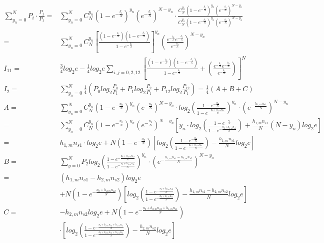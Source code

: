 \documentclass[12pt]{article}
\begin{document}
\begin{equation*}
    \begin{aligned}
       \sum_{y_n=0}^NP_i·\frac{P_j}{P_1}=&\sum_{y_n=0}^NC_N^{y_n}\left(1-e^{-\frac{k_i}{N}}\right)^{y_n}\left(e^{-\frac{k_i}{N}}\right)^{N-y_n}·\frac{C_N^{y_n}\left(1-e^{-\frac{k_j}{N}}\right)^{y_n}\left(e^{-\frac{k_j}{N}}\right)^{N-y_n}}{C_N^{y_n}\left(1-e^{-\frac{k_1}{N}}\right)^{y_n}\left(e^{-\frac{k_1}{N}}\right)^{N-y_n}}\\
        =&\sum_{y_n=0}^NC_N^{y_n}\left[\frac{\left(1-e^{-\frac{k_i}{N}}\right)\left(1-e^{-\frac{k_j}{N}}\right)}{1-e^{-\frac{k_1}{N}}}\right]^{y_n}\left(\frac{e^{-\frac{k_i}{N}}e^{-\frac{k_j}{N}}}{e^{-\frac{k_1}{N}}}\right)^{N-y_n}\\
        I_{11}=&\frac{3}{4}log_2e-\frac{1}{4}log_2e\sum_{i,j=0,2,12}\left[\frac{\left(1-e^{-\frac{k_i}{N}}\right)\left(1-e^{-\frac{k_j}{N}}\right)}{1-e^{-\frac{k_1}{N}}}+\left(\frac{e^{-\frac{k_i}{N}}e^{-\frac{k_j}{N}}}{e^{-\frac{k_1}{N}}}\right)\right]^{N}\\
        I_2=&\sum_{y_n=0}^N\frac{1}{4}(P_{0}log_2\frac{P_0}{P_1}+P_{1}log_2\frac{P_2}{P_1}+P_{12}log_2\frac{P_{12}}{P_1}) = \frac{1}{4}(A+B+C) \\
        A=&\sum_{y_n=0}^NC_N^{y_n}\left(1-e^{-\frac{n_b}{N}}\right)^{y_n}\left(e^{-\frac{n_b}{N}}\right)^{N-y_n}·log_2\left(\frac{1-e^{-\frac{n_b}{N}}}{1-e^{-\frac{n_b+h_{1,m}n_{s1}}{N}}}\right)^{y_n}·\left(e^{-\frac{h_{1,m}n_{s1}}{N}}\right)^{N-y_n} \\ 
        =&\sum_{y_n=0}^NC_N^{y_n}\left(1-e^{-\frac{n_b}{N}}\right)^{y_n}\left(e^{-\frac{n_b}{N}}\right)^{N-y_n}\left[y_n·log_2\left(\frac{1-e^{-\frac{n_b}{N}}}{1-e^{-\frac{n_b+h_{1,m}n_{s1}}{N}}}\right)+\frac{h_{1,m}n_{s1}}{N}(N-y_n)log_2e\right] \\
        =& h_{1,m}n_{s1}·log_2e+N\left(1-e^{-\frac{n_b}{N}}\right)\left[log_2\left(\frac{1-e^{-\frac{n_b}{N}}}{1-e^{-\frac{n_b+h_{1,m}n_{s1}}{N}}}\right)-\frac{h_{1,m}n_{s1}}{N}log_2e\right] \\
        B=&\sum_{y=0}^NP_2log_2\left(\frac{1-e^{-\frac{n_b+h_{2,m}n_{s2}}{N}}}{1-e^{-\frac{n_b+h_{1,m}n_{s1}}{N}}}\right)^{y_n}·\left(e^{-\frac{h_{1,m}n_{s1}-h_{2,m}n_{s2}}{N}}\right)^{N-y_n} \\
        =&(h_{1,m}n_{s1}-h_{2,m}n_{s2})log_2e\\
        &+N\left(1-e^{-\frac{n_b+h_{2,m}n_{s2}}{N}}\right)\left[log_2\left(\frac{1-e^{-\frac{n_b+h_{2,m}n_{s2}}{N}}}{1-e^{-\frac{n_b+h_{1,m}n_{s1}}{N}}}\right)-\frac{h_{1,m}n_{s1}-h_{2,m}n_{s2}}{N}log_2e\right] \\
        C=&-h_{2,m}n_{s2}log_2e+N\left(1-e^{-\frac{n_b+h_{2,m}n_{s2}+h_{1,m}n_{s1}}{N}}\right)\\
        &·\left[log_2\left(\frac{1-e^{-\frac{n_b+h_{2,m}n_{s2}+h_{1,m}n_{s1}}{N}}}{1-e^{-\frac{n_b+h_{2,m}n_{s2}+h_{1,m}n_{s1}}{N}}}\right)-\frac{h_{2,m}n_{s2}}{N}log_2e\right]
    \end{aligned}
\end{equation*}
\end{document}
